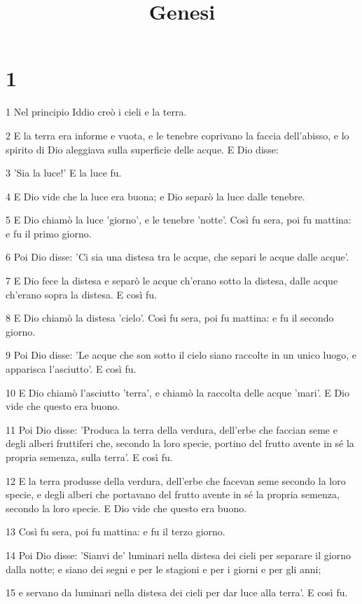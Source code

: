 

\title{Genesi}


\chapter{1}

\par 1 Nel principio Iddio creò i cieli e la terra.
\par 2 E la terra era informe e vuota, e le tenebre coprivano la faccia dell'abisso, e lo spirito di Dio aleggiava sulla superficie delle acque. E Dio disse:
\par 3 'Sia la luce!' E la luce fu.
\par 4 E Dio vide che la luce era buona; e Dio separò la luce dalle tenebre.
\par 5 E Dio chiamò la luce 'giorno', e le tenebre 'notte'. Così fu sera, poi fu mattina: e fu il primo giorno.
\par 6 Poi Dio disse: 'Ci sia una distesa tra le acque, che separi le acque dalle acque'.
\par 7 E Dio fece la distesa e separò le acque ch'erano sotto la distesa, dalle acque ch'erano sopra la distesa. E così fu.
\par 8 E Dio chiamò la distesa 'cielo'. Così fu sera, poi fu mattina: e fu il secondo giorno.
\par 9 Poi Dio disse: 'Le acque che son sotto il cielo siano raccolte in un unico luogo, e apparisca l'asciutto'. E così fu.
\par 10 E Dio chiamò l'asciutto 'terra', e chiamò la raccolta delle acque 'mari'. E Dio vide che questo era buono.
\par 11 Poi Dio disse: 'Produca la terra della verdura, dell'erbe che faccian seme e degli alberi fruttiferi che, secondo la loro specie, portino del frutto avente in sé la propria semenza, sulla terra'. E così fu.
\par 12 E la terra produsse della verdura, dell'erbe che facevan seme secondo la loro specie, e degli alberi che portavano del frutto avente in sé la propria semenza, secondo la loro specie. E Dio vide che questo era buono.
\par 13 Così fu sera, poi fu mattina: e fu il terzo giorno.
\par 14 Poi Dio disse: 'Sianvi de' luminari nella distesa dei cieli per separare il giorno dalla notte; e siano dei segni e per le stagioni e per i giorni e per gli anni;
\par 15 e servano da luminari nella distesa dei cieli per dar luce alla terra'. E così fu.
